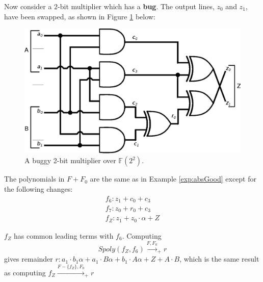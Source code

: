 
\begin{Example}\label{ex:improve1}
Now consider a $2$-bit multiplier which has a {\bf bug}.
The output lines, $z_0$ and $z_1$, have been swapped, as shown in 
Figure \ref{fig:2bitmulbug} below:

\begin{figure}[H]
\centerline{
\includegraphics[scale=0.4]{./figures/2bitmasmultBUGswap}
}
\caption{ A buggy 2-bit multiplier over ${\mathbb{F}}(2^2)$.}
\label{fig:2bitmulbug}
\end{figure}

The polynomials in $F+F_0$ are the same as in Example \ref{exp:absGood} 
except for the following changes:
\begin{eqnarray}
f_6:z_1+c_0 + c_3	\nonumber	\\
f_7:z_0+r_0 + c_3	\nonumber	\\
f_Z:z_1 + z_0\cdot \alpha + Z  \nonumber	
\end{eqnarray}

$f_Z$ has common leading terms with $f_6$. Computing 
\begin{equation}
Spoly(f_Z,f_{6})\stackrel{F,F_0}{\longrightarrow}_+ r \nonumber
\end{equation}
gives remainder $r: a_1\cdot b_1 \alpha + a_1\cdot B \alpha + b_1 \cdot A \alpha + Z + A\cdot B$, which is the same result as computing
$f_Z\xrightarrow{F-\{f_Z\},F_0}_+ r$
\label{exp:2bitbugmulex}
\end{Example}


